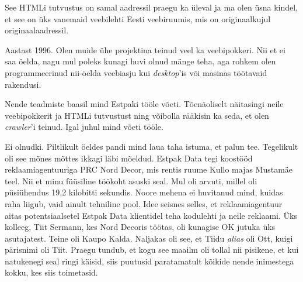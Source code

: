 
See HTMLi tutvustus on samal aadressil praegu ka üleval ja ma 
olen üsna kindel, et see on üks vanemaid veebilehti 
Eesti veebiruumis, mis on originaalkujul originaalaadressil. 


Aastast 1996. Olen muide ühe projektina teinud veel ka veebipokkeri. Nii et ei saa öelda, nagu mul poleks kunagi huvi olnud 
mänge teha, aga rohkem olen programmeerinud nii-öelda 
veebiasju kui \emph{desktop}'is või masinas töötavaid rakendusi. 

Nende teadmiste baasil mind Estpaki tööle võeti. Tõenäoliselt 
näitasingi neile veebipokkerit ja 
HTMLi tutvustust ning võibolla rääkisin ka seda, et olen 
\emph{crawler}'i teinud. Igal juhul mind võeti tööle.


Ei olnudki. Piltlikult öeldes pandi mind laua taha istuma, et palun tee. 
Tegelikult oli see mõnes mõttes ikkagi läbi mõeldud. Estpak Data tegi koostööd reklaamiagentuuriga PRC Nord Decor, mis rentis ruume Kullo majas 
Mustamäe teel. Nii et minu füüsiline töökoht asuski seal. Mul oli arvuti, millel oli püsiühendus 19,2 
kilobitti sekundis. Noore mehena ei huvitanud mind, kuidas raha liigub, vaid ainult 
tehniline pool. Idee seisnes selles, et reklaamiagentuur aitas 
potentsiaalsetel Estpak Data klientidel teha kodulehti ja neile 
reklaami. Üks kolleeg, Tiit Sermann, kes Nord Decoris töötas, oli kunagise 
OK jutuka üks asutajatest. Teine oli
Kaupo Kalda. Naljakas oli see, et Tiidu \emph{alias} oli Ott, kuigi
pärisnimi oli Tiit. Praegu tundub, et kogu see 
maailm oli tollal nii pisikene, et kui natukenegi seal ringi 
käisid, siis puutusid paratamatult kõikide nende inimestega kokku, 
kes siis toimetasid.

